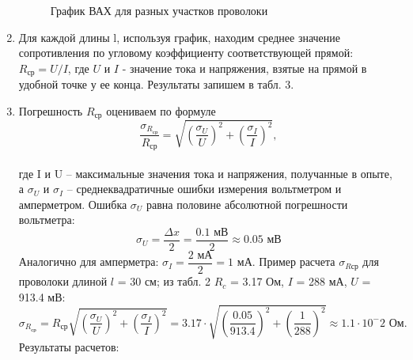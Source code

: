 \documentclass[a4paper, 10pt]{article}%
\begin{document}
\begin{enumerate}
\begin{figure}[h]
\caption{График ВАХ для разных участков проволоки}
\centering
{}
\end{figure}
\item Для каждой длины l, используя график, находим среднее значение сопротивления по угловому коэффициенту соответствующей прямой: $R_\text{ср} = U/I$, где $U$ и $I$ - значение тока и напряжения, взятые на прямой в удобной точке у ее конца. Результаты запишем в табл. 3.
\item Погрешность $R_\text{ср}$ оцениваем по формуле \\
\[\dfrac{\sigma_{R_\text{ср}}}{R_\text{ср}} = \sqrt{\left(\dfrac{\sigma_U}{U}\right)^2+\left(\dfrac{\sigma_I}{I}\right)^2}, \]\\
где I и U -- максимальные значения тока и напряжения, получанные в опыте, а $\sigma_U$ и $\sigma_I$ -- среднеквадратичные ошибки измерения вольтметром и амперметром. Ошибка $\sigma_U$ равна половине абсолютной погрешности вольтметра:
\[\sigma_U = \dfrac{\Delta x}{2} = \dfrac{0.1\text{ мВ}}{2} \approx 0.05\text{ мВ} \]
Аналогично для амперметра: $\sigma_I = \dfrac{2\text{ мА}}{2} = 1\text{ мА}$.
Пример расчета $\sigma_{R\text{ср}}$ для проволоки длиной $l$ = 30 см; из табл. 2 $R_c$ = 3.17 Ом, $I$ = 288 мА, $U$ = 913.4 мВ:
\[\sigma_{R_\text{ср}}= R_\text{ср}\sqrt{\left(\dfrac{\sigma_U}{U}\right)^2+\left(\dfrac{\sigma_I}{I}\right)^2} = 3.17\cdot\sqrt{\left(\dfrac{0.05}{913.4}\right)^2+\left(\dfrac{1}{288}\right)^2} \approx 1.1\cdot10^-2\text{ Ом}.\]
Результаты расчетов:


\end{enumerate}
\end{document}
